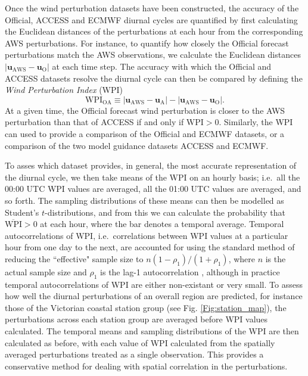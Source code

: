 \documentclass[alpha-refs]{wiley-article}
\begin{document}
Once the wind perturbation datasets have been constructed, the accuracy of the Official, ACCESS and ECMWF diurnal cycles are quantified by first calculating the Euclidean distances of the perturbations at each hour from the corresponding AWS perturbations. For instance, to quantify how closely the Official forecast perturbations match the AWS observations, we calculate the Euclidean distances $\left\lvert \boldsymbol{u}_{\text{AWS}}-\boldsymbol{u}_{\text{O}} \right\rvert$ at each time step. The accuracy with which the Official and ACCESS datasets resolve the diurnal cycle can then be compared by defining the \textit{Wind Perturbation Index} (WPI) 
\begin{equation}
\text{WPI}_\text{OA} \equiv \left\lvert \boldsymbol{u}_{\text{AWS}}-\boldsymbol{u}_{\text{A}} \right\rvert - \left\lvert \boldsymbol{u}_{\text{AWS}}-\boldsymbol{u}_{\text{O}} \right\rvert.
\end{equation} 
At a given time, the Official forecast wind perturbation is closer to the AWS perturbation than that of ACCESS if and only if $\text{WPI} > 0$. Similarly, the WPI can used to provide a comparison of the Official and ECMWF datasets, or a comparison of the two model guidance datasets ACCESS and ECMWF.  

To asses which dataset provides, in general, the most accurate representation of the diurnal cycle, we then take means of the WPI on an hourly basis; i.e.~all the 00:00 UTC WPI values are averaged, all the 01:00 UTC values are averaged, and so forth. The sampling distributions of these means can then be modelled as Student's $t$-distributions, and from this we can calculate the probability that $\overline{\text{WPI}} > 0$ at each hour, where the bar denotes a temporal average. Temporal autocorrelations of WPI, i.e.~correlations between WPI values at a particular hour from one day to the next, are accounted for using the standard method of reducing the ``effective" sample size to $ n \left(1-\rho_1\right)/\left(1+\rho_1\right)$, where $n$ is the actual sample size and $\rho_1$ is the lag-1 autocorrelation \citep{zwiers95,wilks11}, although in practice temporal autocorrelations of WPI are either non-existant or very small. To assess how well the diurnal perturbations of an overall region are predicted, for instance those of the Victorian coastal station group (see Fig. \ref{Fig:station_map}), the perturbations across each station group are averaged before WPI values calculated. The temporal means and sampling distributions of the WPI are then calculated as before, with each value of WPI calculated from the spatially averaged perturbations treated as a single observation. This provides a conservative method for dealing with spatial correlation in the perturbations.        
\end{document}
